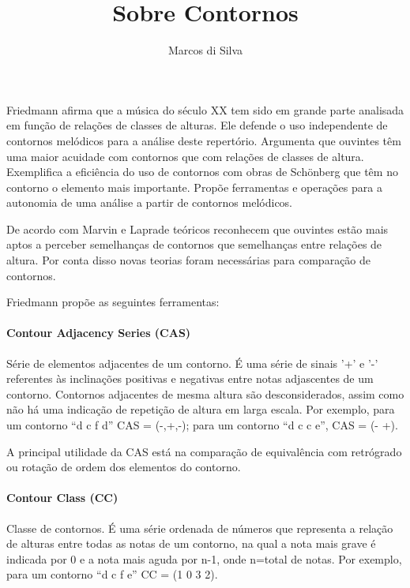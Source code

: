 \documentclass{article}
\title{Sobre Contornos}
\author{Marcos di Silva}
\begin{document}
\setlength{\parindent}{0cm}
\maketitle
\thispagestyle{empty}

Friedmann \cite{friedmann:methodology} afirma que a música do século
XX tem sido em grande parte analisada em função de relações de classes
de alturas. Ele defende o uso independente de contornos melódicos para
a análise deste repertório. Argumenta que ouvintes têm uma maior
acuidade com contornos que com relações de classes de
altura. Exemplifica a eficiência do uso de contornos com obras de
Schönberg que têm no contorno o elemento mais importante. Propõe
ferramentas e operações para a autonomia de uma análise a partir de
contornos melódicos.

De acordo com Marvin e Laprade \cite{marvin.ea:relating} teóricos
reconhecem que ouvintes estão mais aptos a perceber semelhanças de
contornos que semelhanças entre relações de altura. Por conta disso
novas teorias foram necessárias para comparação de contornos.

Friedmann \cite{friedmann:methodology} propõe as seguintes
ferramentas:

\paragraph{Contour Adjacency Series (CAS)}
\label{sec:cont-adjac-seri}

Série de elementos adjacentes de um contorno. É uma série de sinais
'+' e '-' referentes às inclinações positivas e negativas entre notas
adjascentes de um contorno. Contornos adjacentes de mesma altura são
desconsiderados, assim como não há uma indicação de repetição de
altura em larga escala. Por exemplo, para um contorno ``d c f d'' CAS
= (-,+,-); para um contorno ``d c c e'', CAS = (- +).

A principal utilidade da CAS está na comparação de equivalência com
retrógrado ou rotação de ordem dos elementos do contorno.

\paragraph{Contour Class (CC)}
\label{sec:contour-class-cc}

Classe de contornos. É uma série ordenada de números que representa a
relação de alturas entre todas as notas de um contorno, na qual a nota
mais grave é indicada por 0 e a nota mais aguda por n-1, onde n=total
de notas. Por exemplo, para um contorno ``d c f e'' CC = (1 0 3 2).
\end{document}
